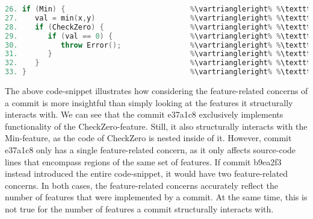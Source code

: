 \begin{lstlisting}[language=C++, caption={Example Use-case for the Feature-related Concerns of a Commit}]	
26. if (Min) {                             %\vartriangleright% %\texttt{b9ea2f3}%    %\vartriangleright% %Min%
27.    val = min(x,y)                      %\vartriangleright% %\texttt{b9ea2f3}%    %\vartriangleright% %Min%
28.    if (CheckZero) {                    %\vartriangleright% %\texttt{e37a1c8}%    %\vartriangleright% %Min% %\land% %CheckZero%
29.       if (val == 0) {                  %\vartriangleright% %\texttt{e37a1c8}%    %\vartriangleright% %Min% %\land% %CheckZero%
30.          throw Error();                %\vartriangleright% %\texttt{e37a1c8}%    %\vartriangleright% %Min% %\land% %CheckZero%
31.       }                                %\vartriangleright% %\texttt{e37a1c8}%    %\vartriangleright% %Min% %\land% %CheckZero%
32.    }                                   %\vartriangleright% %\texttt{e37a1c8}%    %\vartriangleright% %Min% %\land% %CheckZero%
33. }                                      %\vartriangleright% %\texttt{b9ea2f3}%    %\vartriangleright% %Min%
\end{lstlisting}
\label{lst:commit_concerns}
The above code-snippet illustrates how considering the feature-related concerns of a commit is more insightful than simply looking at the features it structurally interacts with. 
We can see that the commit \textsf{e37a1c8} exclusively implements functionality of the \textsf{CheckZero}-feature. 
Still, it also structurally interacts with the \textsf{Min}-feature, as the code of \textsf{CheckZero} is nested inside of it. 
However, commit \textsf{e37a1c8} only has a single feature-related concern, as it only affects source-code lines that encompass regions of the same set of features.
If commit \textsf{b9ea2f3} instead introduced the entire code-snippet, it would have two feature-related concerns.
In both cases, the feature-related concerns accurately reflect the number of features that were implemented by a commit.
At the same time, this is not true for the number of features a commit structurally interacts with.

